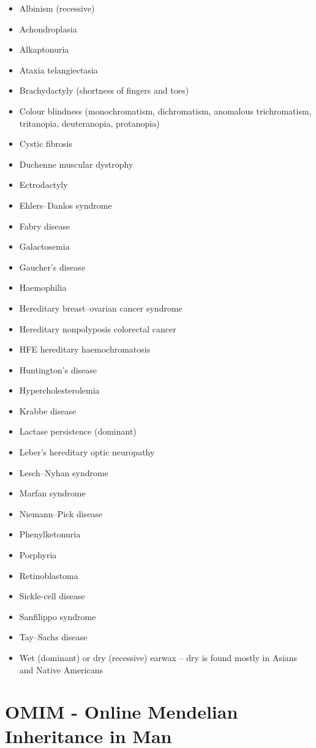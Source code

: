 \begin{itemize}
\tightlist
\item
  Albinism (recessive)
\item
  Achondroplasia
\item
  Alkaptonuria
\item
  Ataxia telangiectasia
\item
  Brachydactyly (shortness of fingers and toes)
\item
  Colour blindness (monochromatism, dichromatism, anomalous trichromatism, tritanopia, deuteranopia, protanopia)
\item
  Cystic fibrosis
\item
  Duchenne muscular dystrophy
\item
  Ectrodactyly
\item
  Ehlers--Danlos syndrome
\item
  Fabry disease
\item
  Galactosemia
\item
  Gaucher's disease
\item
  Haemophilia
\item
  Hereditary breast--ovarian cancer syndrome
\item
  Hereditary nonpolyposis colorectal cancer
\item
  HFE hereditary haemochromatosis
\item
  Huntington's disease
\item
  Hypercholesterolemia
\item
  Krabbe disease
\item
  Lactase persistence (dominant)
\item
  Leber's hereditary optic neuropathy
\item
  Lesch--Nyhan syndrome
\item
  Marfan syndrome
\item
  Niemann--Pick disease
\item
  Phenylketonuria
\item
  Porphyria
\item
  Retinoblastoma
\item
  Sickle-cell disease
\item
  Sanfilippo syndrome
\item
  Tay--Sachs disease
\item
  Wet (dominant) or dry (recessive) earwax -- dry is found mostly in Asians and Native Americans
\end{itemize}

\hypertarget{omim---online-mendelian-inheritance-in-man}{%
\section{OMIM - Online Mendelian Inheritance in Man}\label{omim---online-mendelian-inheritance-in-man}}

